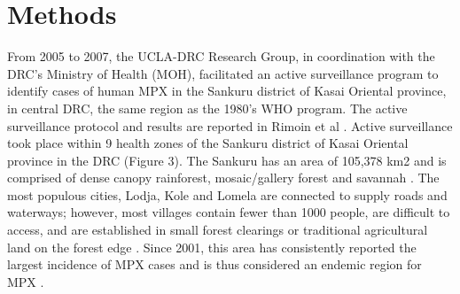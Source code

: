 \section{Methods}

From 2005 to 2007, the UCLA-DRC Research Group, in coordination with the DRC’s Ministry of Health (MOH), facilitated an active surveillance program to identify cases of human MPX in the Sankuru district of Kasai Oriental province, in central DRC, the same region as the 1980’s WHO program. The active surveillance protocol and results are reported in Rimoin et al \cite{Rimoin2010}.
Active surveillance took place within 9 health zones of the Sankuru district of Kasai Oriental province in the DRC (Figure 3). The Sankuru has an area of 105,378 km2 and is comprised of dense canopy rainforest, mosaic/gallery forest and savannah \cite{Fuller2011}. The most populous cities, Lodja, Kole and Lomela are connected to supply roads and waterways; however, most villages contain fewer than 1000 people, are difficult to access, and are established in small forest clearings or traditional agricultural land on the forest edge \cite{Rimoin2010}. Since 2001, this area has consistently reported the largest incidence of MPX cases and is thus considered an endemic region for MPX \cite{Rimoin2010}. 
